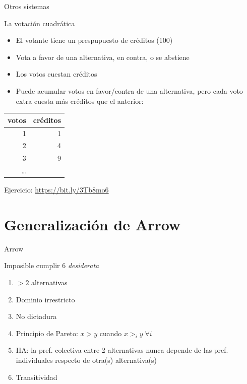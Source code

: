 \documentclass[bigger]{beamer}
\begin{document}
\begin{frame}[label={sec:org87b2226}]{Otros sistemas}
\begin{block}{La votación cuadrática}
\begin{itemize}
\item El votante tiene un prespupuesto de créditos (100)
\item Vota a favor de una alternativa, en contra, o se abstiene
\item Los votos cuestan créditos
\item Puede acumular votos en favor/contra de una alternativa, pero cada voto extra cuesta más créditos que el anterior:
\end{itemize}
\begin{center}
\begin{tabular}{rr}
votos & créditos\\[0pt]
\hline
1 & 1\\[0pt]
2 & 4\\[0pt]
3 & 9\\[0pt]
\ldots{} & \\[0pt]
\end{tabular}
\end{center}
Ejercicio: \url{https://bit.ly/3Tb8mo6}
\end{block}
\end{frame}
\section{Generalización de Arrow}
\label{sec:org8639346}
\begin{frame}[label={sec:orgd2e8c28}]{Arrow}
\begin{block}{Imposible cumplir 6 \emph{desiderata}}
\begin{enumerate}
\item \(>2\) alternativas
\item Dominio irrestricto
\item No dictadura
\item Principio de Pareto: \(x>y\) cuando \(x>_iy\;\forall i\)
\item IIA: la pref. colectiva entre 2 alternativas nunca depende de las pref. individuales respecto de otra(s) alternativa(s)
\item Transitividad
\end{enumerate}
\end{block}
\end{frame}
\end{document}
